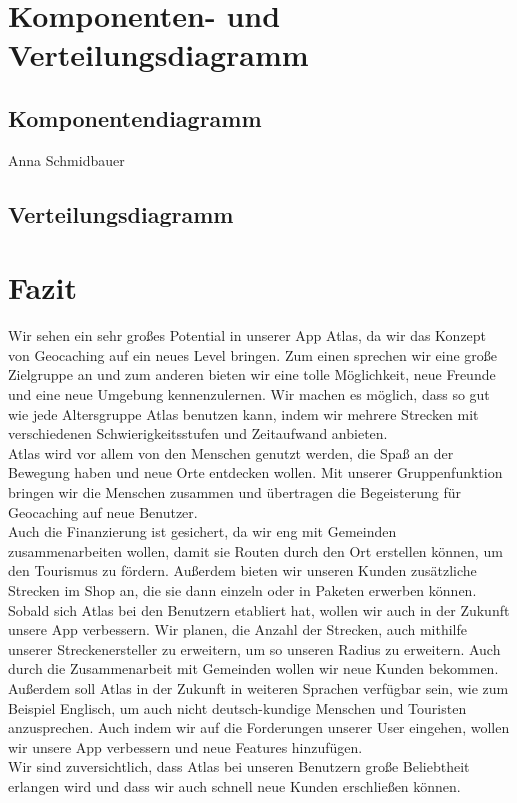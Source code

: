 \documentclass[a4paper, 12pp]{article}
\begin{document}
\section{Komponenten- und Verteilungsdiagramm}
\subsection{Komponentendiagramm}

Anna Schmidbauer
\begin{figure}[H] 
\centering
	\fbox{\begin{minipage}{16cm} 
	\end{minipage}}
\end{figure}

\subsection{Verteilungsdiagramm}
\section{Fazit}
Wir sehen ein sehr großes Potential in unserer App Atlas, da wir das Konzept von Geocaching auf ein neues Level bringen. Zum einen sprechen wir eine große Zielgruppe an und zum anderen bieten wir eine tolle Möglichkeit, neue Freunde und eine neue Umgebung kennenzulernen. Wir machen es möglich, dass so gut wie jede Altersgruppe Atlas benutzen kann, indem wir mehrere Strecken mit verschiedenen Schwierigkeitsstufen und Zeitaufwand anbieten.\\
Atlas wird vor allem von den Menschen genutzt werden, die Spaß an der Bewegung haben und neue Orte entdecken wollen. Mit unserer Gruppenfunktion bringen wir die Menschen zusammen und übertragen die Begeisterung für Geocaching auf neue Benutzer.\\
Auch die Finanzierung ist gesichert, da wir eng mit Gemeinden zusammenarbeiten wollen, damit sie Routen durch den Ort erstellen können, um den Tourismus zu fördern. Außerdem bieten wir unseren Kunden zusätzliche Strecken im Shop an, die sie dann einzeln oder in Paketen erwerben können.\\
Sobald sich Atlas bei den Benutzern etabliert hat, wollen wir auch in der Zukunft unsere App verbessern. Wir planen, die Anzahl der Strecken, auch mithilfe unserer Streckenersteller zu erweitern, um so unseren Radius zu erweitern. Auch durch die Zusammenarbeit mit Gemeinden wollen wir neue Kunden bekommen. Außerdem soll Atlas in der Zukunft in weiteren Sprachen verfügbar sein, wie zum Beispiel Englisch, um auch nicht deutsch-kundige Menschen und Touristen anzusprechen. Auch indem wir auf die Forderungen unserer User eingehen, wollen wir unsere App verbessern und neue Features hinzufügen.\\
Wir sind zuversichtlich, dass Atlas bei unseren Benutzern große Beliebtheit erlangen wird und dass wir auch schnell neue Kunden erschließen können.\\
\end{document}
